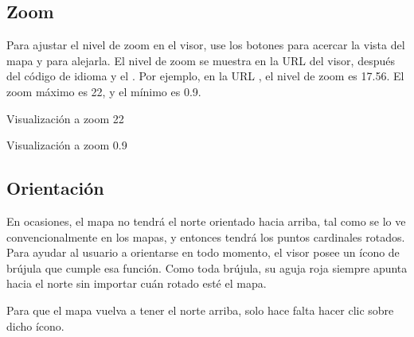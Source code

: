 \documentclass[a4paper,11pt,spanish]{sphinxmanual}
\begin{document}

\sphinxstepscope


\subsection{Zoom}
\label{\detokenize{tools/zoom:zoom}}\label{\detokenize{tools/zoom::doc}}

\sphinxAtStartPar
Para ajustar el nivel de zoom en el visor, use los botones \sphinxstylestrong{+} para acercar la vista del mapa y \sphinxstylestrong{\sphinxhyphen{}} para alejarla. El nivel de zoom se muestra en la URL del visor, después del código de idioma y el \sphinxstylestrong{\#}. Por ejemplo, en la URL , el nivel de zoom es 17.56. El zoom máximo es 22, y el mínimo es 0.9.

\sphinxAtStartPar
Visualización a zoom 22

\noindent{}

\sphinxAtStartPar
Visualización a zoom 0.9

\noindent{}

\sphinxstepscope


\subsection{Orientación}
\label{\detokenize{tools/orientation:orientacion}}\label{\detokenize{tools/orientation::doc}}
\sphinxAtStartPar
En ocasiones, el mapa no tendrá el norte orientado hacia arriba, tal como se lo ve convencionalmente en los mapas, y entonces tendrá los puntos cardinales rotados. Para ayudar al usuario a orientarse en todo momento, el visor posee un ícono de brújula que cumple esa función. Como toda brújula, su aguja roja siempre apunta hacia el norte sin importar cuán rotado esté el mapa.


\sphinxAtStartPar
Para que el mapa vuelva a tener el norte arriba, solo hace falta hacer clic sobre dicho ícono.
\end{document}
